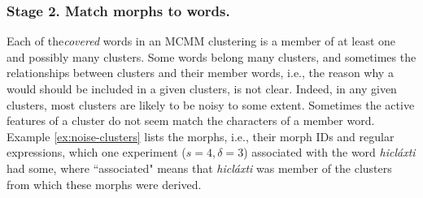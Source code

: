 
\subsubsection{Stage 2. Match morphs to words.} 
Each of the\emph{covered} words in an MCMM clustering is a member of at least one and possibly many clusters. Some words belong many clusters, and sometimes the relationships between clusters and their member words, i.e., the reason why a would should be included in a given clusters, is not clear. Indeed, in any given clusters, most clusters are likely to be noisy to some extent. Sometimes the active features of a cluster do not seem match the characters of a member word. Example \ref{ex:noise-clusters} lists the morphs, i.e., their morph IDs and regular expressions, which one experiment ($s = 4,\delta = 3$) associated with the word \textit{hicl\'{a}xti} had some, where ``associated" means that \textit{hicl\'{a}xti} was member of the clusters from which these morphs were derived.

